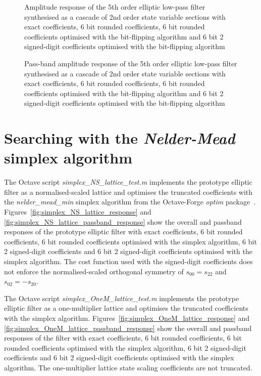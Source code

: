 \documentclass[a4paper,twoside,10pt,english]{report}
\begin{document}
\begin{figure}[!htbp]
\begin{center}
\scalebox{0.7}{}
\caption{Amplitude response of the 5th order elliptic low-pass
filter synthesised as a cascade of 2nd order state variable sections with 
exact coefficients, 6 bit rounded coefficients, 6 bit rounded coefficients 
optimised with the bit-flipping algorithm
and 6 bit 2 signed-digit coefficients optimised with the bit-flipping algorithm}
\label{fig:bitflip_svcasc_response}
\end{center}
\end{figure}

\begin{figure}[!htbp]
\begin{center}
\scalebox{0.7}{}
\caption{Pass-band amplitude response of the 5th order elliptic low-pass
filter synthesised as a cascade of 2nd order state variable sections with
exact coefficients, 6 bit rounded coefficients, 6 bit rounded coefficients 
optimised with the bit-flipping algorithm 
and 6 bit 2 signed-digit coefficients optimised with the bit-flipping algorithm}
\label{fig:bitflip_svcasc_passband_response}
\end{center}
\end{figure}
\clearpage
\section{Searching with the \emph{Nelder-Mead} simplex algorithm}
The Octave script \emph{simplex\_NS\_lattice\_test.m} implements the prototype
elliptic filter as a normalised-scaled lattice and optimises the truncated
coefficients with the \emph{nelder\_mead\_min} simplex algorithm from the
Octave-Forge \emph{optim} package~\cite{OctaveForge_OptimPackage}. 
Figures~\ref{fig:simplex_NS_lattice_response} and
\ref{fig:simplex_NS_lattice_passband_response} show the overall and passband
responses of the prototype elliptic filter with exact coefficients, 
6 bit rounded coefficients, 6 bit rounded coefficients optimised with the 
simplex algorithm, 6 bit 2 signed-digit coefficients and 6 bit 2 signed-digit
coefficients optimised with the simplex algorithm. The cost function used with
the signed-digit coefficients does not enforce the normalised-scaled orthogonal
symmetry of $s_{00}=s_{22}$ and $s_{02}=-s_{20}$.

The Octave script \emph{simplex\_OneM\_lattice\_test.m} implements the prototype
elliptic filter as a one-multiplier lattice and optimises the truncated
coefficients with the simplex algorithm.
Figures~\ref{fig:simplex_OneM_lattice_response} and
\ref{fig:simplex_OneM_lattice_passband_response} show the overall and passband
responses of the filter with exact coefficients, 6 bit rounded coefficients, 
6 bit rounded coefficients optimised with the simplex algorithm, 6 bit 
2 signed-digit coefficients and 6 bit 2 signed-digit coefficients optimised
with the simplex algorithm. The one-multiplier lattice state scaling
coefficients are not truncated.
\end{document}
